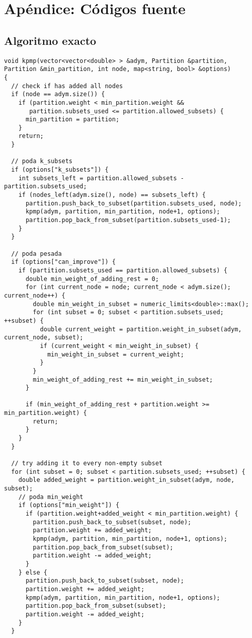 \section{Apéndice: Códigos fuente}

\subsection{Algoritmo exacto}

\begin{lstlisting}[frame=single]
void kpmp(vector<vector<double> > &adym, Partition &partition, Partition &min_partition, int node, map<string, bool> &options)
{
  // check if has added all nodes
  if (node == adym.size()) {
    if (partition.weight < min_partition.weight &&
       partition.subsets_used <= partition.allowed_subsets) {
      min_partition = partition;
    }
    return;
  }

  // poda k_subsets
  if (options["k_subsets"]) {
    int subsets_left = partition.allowed_subsets - partition.subsets_used;
    if (nodes_left(adym.size(), node) == subsets_left) {
      partition.push_back_to_subset(partition.subsets_used, node);
      kpmp(adym, partition, min_partition, node+1, options);
      partition.pop_back_from_subset(partition.subsets_used-1);
    }
  }

  // poda pesada
  if (options["can_improve"]) {
    if (partition.subsets_used == partition.allowed_subsets) {
      double min_weight_of_adding_rest = 0;
      for (int current_node = node; current_node < adym.size(); current_node++) {
        double min_weight_in_subset = numeric_limits<double>::max();
        for (int subset = 0; subset < partition.subsets_used; ++subset) {
          double current_weight = partition.weight_in_subset(adym, current_node, subset);
          if (current_weight < min_weight_in_subset) {
            min_weight_in_subset = current_weight;
          }
        }
        min_weight_of_adding_rest += min_weight_in_subset;
      }

      if (min_weight_of_adding_rest + partition.weight >= min_partition.weight) {
        return;
      }
    }
  }

  // try adding it to every non-empty subset
  for (int subset = 0; subset < partition.subsets_used; ++subset) {
    double added_weight = partition.weight_in_subset(adym, node, subset);
    // poda min_weight
    if (options["min_weight"]) {
      if (partition.weight+added_weight < min_partition.weight) {
        partition.push_back_to_subset(subset, node);
        partition.weight += added_weight;
        kpmp(adym, partition, min_partition, node+1, options);
        partition.pop_back_from_subset(subset);
        partition.weight -= added_weight;
      }
    } else {
      partition.push_back_to_subset(subset, node);
      partition.weight += added_weight;
      kpmp(adym, partition, min_partition, node+1, options);
      partition.pop_back_from_subset(subset);
      partition.weight -= added_weight;
    }
  }


\end{lstlisting}
